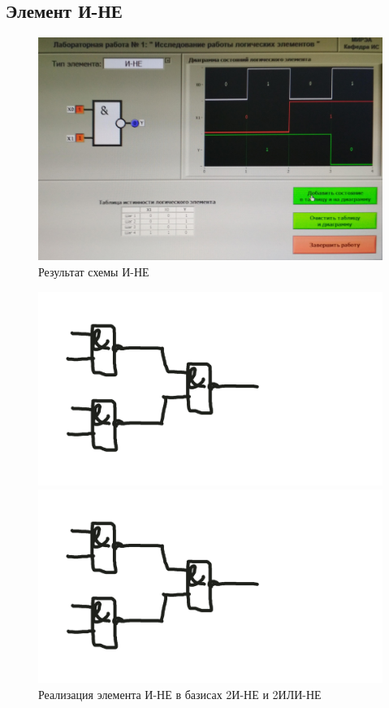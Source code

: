 \subsection{Элемент И-НЕ}

\begin{figure}[H]
	\centering
	\includegraphics[width=0.85\linewidth]{imgs/1/and-not}
	\caption{Результат схемы И-НЕ}
	\label{fig:1_and-not}
\end{figure}

\begin{figure}[H]
	\centering
	\begin{minipage}{.45\textwidth}
		\centering
		\includegraphics[width=0.85\linewidth]{imgs/1/and-not_and}
	\end{minipage}
	\begin{minipage}{.45\textwidth}
		\centering
		\includegraphics[width=0.85\linewidth]{imgs/1/and-not_or}
	\end{minipage}
	\caption{Реализация элемента И-НЕ в базисах 2И-НЕ и 2ИЛИ-НЕ}
\end{figure}

